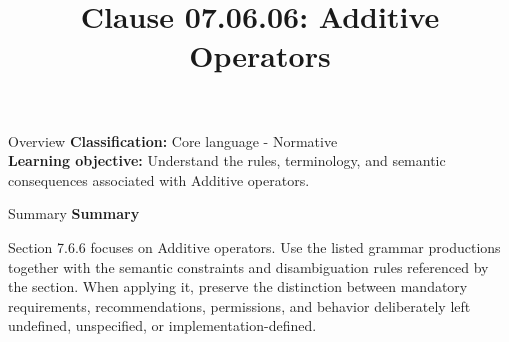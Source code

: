 \documentclass[10pt,letterpaper]{article}
\title{Clause 07.06.06: Additive Operators}
\author{}
\date{}
\begin{document}
\maketitle
\begin{CornellOverviewBox}{Overview}
\textbf{Classification:} Core language - Normative\\[2pt]
\textbf{Learning objective:} Understand the rules, terminology, and semantic consequences associated with Additive operators.
\end{CornellOverviewBox}\begin{CornellSummaryBox}{Summary}
{\sffamily\bfseries\color{Accent} Summary}\par\vspace{3pt}Section 7.6.6 focuses on Additive operators. Use the listed grammar productions together with the semantic constraints and disambiguation rules referenced by the section. When applying it, preserve the distinction between mandatory requirements, recommendations, permissions, and behavior deliberately left undefined, unspecified, or implementation-defined.
\end{CornellSummaryBox}
\end{document}
